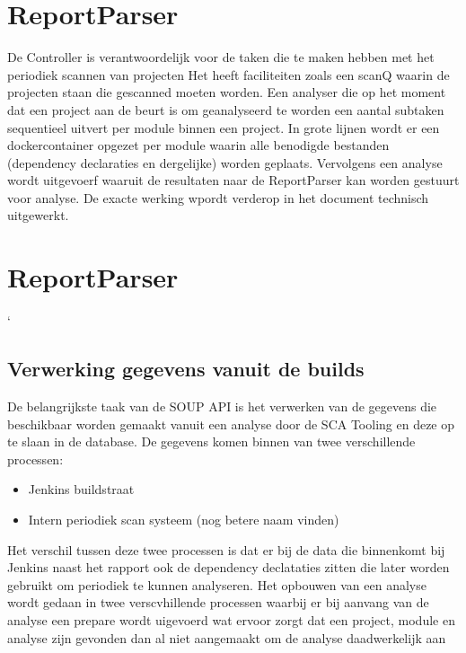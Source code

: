 \section{ReportParser}



De Controller is verantwoordelijk voor de taken die te maken hebben met het periodiek scannen van projecten Het heeft faciliteiten zoals een scanQ waarin de projecten staan die gescanned moeten worden. Een analyser die op het moment dat een project aan de beurt is om geanalyseerd te worden een aantal subtaken sequentieel uitvert per module binnen een project.
In grote lijnen wordt er een dockercontainer opgezet per module waarin alle benodigde bestanden (dependency declaraties en dergelijke) worden geplaats. Vervolgens een analyse wordt uitgevoerf waaruit de resultaten naar de ReportParser kan worden gestuurt voor analyse. De exacte werking wpordt verderop in het document technisch uitgewerkt.


\section{ReportParser}`


\subsection{Verwerking gegevens vanuit de builds}\label{subsec:verwerking-gegevens-vanuit-de-sca}
De belangrijkste taak van de SOUP API is het verwerken van de gegevens die beschikbaar worden gemaakt vanuit een analyse door de SCA Tooling en deze op te slaan in de database. De gegevens komen binnen van twee verschillende processen:
\begin{itemize}
    \item Jenkins buildstraat
    \item Intern periodiek scan systeem (nog betere naam vinden)
\end{itemize}

Het verschil tussen deze twee processen is dat er bij de data die binnenkomt bij Jenkins naast het rapport ook de dependency declataties zitten die later worden gebruikt om periodiek te kunnen analyseren. Het opbouwen van een analyse wordt gedaan in twee verscvhillende processen waarbij er bij aanvang van de analyse een prepare wordt uigevoerd wat ervoor zorgt dat een project, module en analyse zijn gevonden dan al niet aangemaakt om de analyse daadwerkelijk aan



